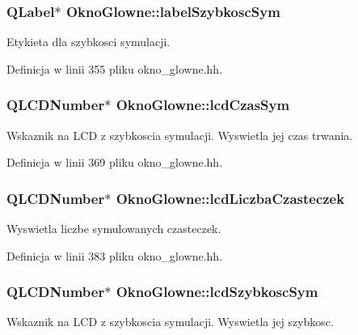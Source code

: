 \hypertarget{class_okno_glowne_ad7b0708ffdf61f3bef1349cc353a6c4e}{
\subsubsection[{label\-Szybkosc\-Sym}]{\setlength{\rightskip}{0pt plus 5cm}Q\-Label$\ast$ Okno\-Glowne\-::label\-Szybkosc\-Sym\hspace{0.3cm}{\ttfamily [private]}}}\label{class_okno_glowne_ad7b0708ffdf61f3bef1349cc353a6c4e}
Etykieta dla szybkosci symulacji. 

Definicja w linii 355 pliku okno\-\_\-glowne.\-hh.

\hypertarget{class_okno_glowne_ab34fefe738e38b1b0d4ce764481cc0c6}{
\subsubsection[{lcd\-Czas\-Sym}]{\setlength{\rightskip}{0pt plus 5cm}Q\-L\-C\-D\-Number$\ast$ Okno\-Glowne\-::lcd\-Czas\-Sym\hspace{0.3cm}{\ttfamily [private]}}}\label{class_okno_glowne_ab34fefe738e38b1b0d4ce764481cc0c6}
Wskaznik na L\-C\-D z szybkoscia symulacji. Wyswietla jej czas trwania. 

Definicja w linii 369 pliku okno\-\_\-glowne.\-hh.

\hypertarget{class_okno_glowne_adbdd9fc009725804e015d267dc8375dc}{
\subsubsection[{lcd\-Liczba\-Czasteczek}]{\setlength{\rightskip}{0pt plus 5cm}Q\-L\-C\-D\-Number$\ast$ Okno\-Glowne\-::lcd\-Liczba\-Czasteczek\hspace{0.3cm}{\ttfamily [private]}}}\label{class_okno_glowne_adbdd9fc009725804e015d267dc8375dc}
Wyswietla liczbe symulowanych czasteczek. 

Definicja w linii 383 pliku okno\-\_\-glowne.\-hh.

\hypertarget{class_okno_glowne_ab100c00d4ba33d896fd0985ac366296a}{
\subsubsection[{lcd\-Szybkosc\-Sym}]{\setlength{\rightskip}{0pt plus 5cm}Q\-L\-C\-D\-Number$\ast$ Okno\-Glowne\-::lcd\-Szybkosc\-Sym\hspace{0.3cm}{\ttfamily [private]}}}\label{class_okno_glowne_ab100c00d4ba33d896fd0985ac366296a}
Wskaznik na L\-C\-D z szybkoscia symulacji. Wyswietla jej szybkosc. 

